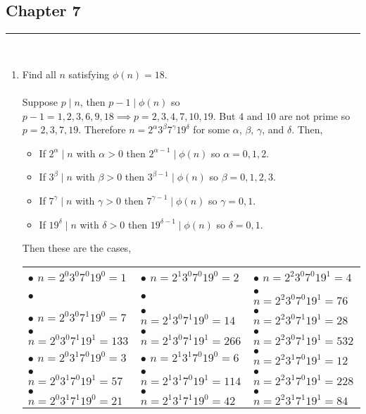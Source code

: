 \documentclass[class=article, crop=false]{standalone}
\begin{document}
\subsection{Chapter 7}
\rule{\textwidth}{1pt}\\
\begin{enumerate}
\item
  Find all $n$ satisfying $\phi(n)=18$. \\\\
  Suppose $p\mid n$, then $p-1\mid \phi(n)$ so $p-1 = 1,2,3,6,9,18 \implies p = 2,3,4,7,10, 19$.
  But $4$ and $10$ are not prime so $p = 2,3,7,19$. Therefore $n = 2^{\alpha} 3^{\beta} 7^{\gamma} 19^{\delta}$
  for some $\alpha$, $\beta$, $\gamma$, and $\delta$. Then, 
  \begin{itemize}
	\item If $2^{\alpha}\mid n$ with $\alpha >0$ then $2^{\alpha -1}\mid\phi(n)$ so $\alpha = 0, 1, 2$.
	\item If $3^{\beta}\mid n$ with $\beta >0$ then $3^{\beta -1}\mid\phi(n)$ so $\beta = 0, 1, 2, 3$.
	\item If $7^{\gamma}\mid n$ with $\gamma >0$ then $7^{\gamma -1}\mid\phi(n)$ so $\gamma = 0, 1$.
	\item If $19^{\delta}\mid n$ with $\delta >0$ then $19^{\delta -1}\mid\phi(n)$ so $\delta = 0, 1$.
  \end{itemize}
  Then these are the cases,
  \begin{center}
	\begin{tabular}{ l l l }
	  $\bullet$ $n=2^0 3^0 7^0 19^0 = 1$ &    $\bullet$ $n=2^1 3^0 7^0 19^0 = 2$ & $\bullet$ $n=2^2 3^0 7^0 19^1 = 4$\\
	  $\bullet$\fbox{$n=2^0 3^0 7^0 19^1 = 19$} &   $\bullet$\fbox{$n=2^1 3^0 7^0 19^1 = 38$} & $\bullet$ $n=2^2 3^0 7^0 19^1 = 76$\\
	  $\bullet$ $n=2^0 3^0 7^1 19^0 = 7$ &    $\bullet$ $n=2^1 3^0 7^1 19^0 = 14$ & $\bullet$ $n=2^2 3^0 7^1 19^1 = 28$\\
	  $\bullet$ $n=2^0 3^0 7^1 19^1 = 133$ &   $\bullet$ $n=2^1 3^0 7^1 19^1 = 266$ & $\bullet$ $n=2^2 3^0 7^1 19^1 = 532$\\
	  $\bullet$ $n=2^0 3^1 7^0 19^0 = 3$ &    $\bullet$ $n=2^1 3^1 7^0 19^0 = 6$ & $\bullet$ $n=2^2 3^1 7^0 19^1 = 12$\\
	  $\bullet$ $n=2^0 3^1 7^0 19^1 = 57$ &   $\bullet$ $n=2^1 3^1 7^0 19^1 = 114$ & $\bullet$ $n=2^2 3^1 7^0 19^1 = 228$\\
	  $\bullet$ $n=2^0 3^1 7^1 19^0 = 21$ &    $\bullet$ $n=2^1 3^1 7^1 19^0 = 42$ & $\bullet$ $n=2^2 3^1 7^1 19^1 = 84$\\

\end{tabular}
\end{center}
\end{enumerate}
\end{document}
